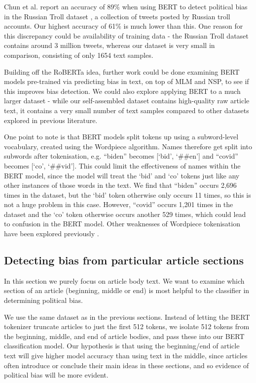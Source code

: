 Chun et al. report an accuracy of 89\% when using BERT to detect political bias in the Russian Troll dataset \cite{russian-troll}, a collection of tweets posted by Russian troll accounts. Our highest accuracy of 61\% is much lower than this. One reason for this discrepancy could be availability of training data - the Russian Troll dataset contains around 3 million tweets, whereas our dataset is very small in comparison, consisting of only 1654 text samples.

Building off the RoBERTa idea, further work could be done examining BERT models pre-trained via predicting bias in text, on top of MLM and NSP, to see if this improves bias detection. We could also explore applying BERT to a much larger dataset - while our self-assembled dataset contains high-quality raw article text, it contains a very small number of text samples compared to other datasets explored in previous literature.

One point to note is that BERT models split tokens up using a subword-level vocabulary, created using the Wordpiece \cite{wordpiece} algorithm. Names therefore get split into subwords after tokenisation, e.g. ``biden'' becomes [`bid', `\#\#en'] and ``covid'' becomes [`co', `\#\#vid']. This could limit the effectiveness of names within the BERT model, since the model will treat the `bid' and `co' tokens just like any other instances of those words in the text. We find that ``biden'' occurs 2,696 times in the dataset, but the `bid' token otherwise only occurs 11 times, so this is not a huge problem in this case. However, ``covid'' occurs 1,201 times in the dataset and the `co' token otherwise occurs another 529 times, which could lead to confusion in the BERT model. Other weaknesses of Wordpiece tokenisation have been explored previously \cite{wordpiece-weaknesses}.

\subsection{Detecting bias from particular article sections} \label{sec:article-sections}

In this section we purely focus on article body text. We want to examine which section of an article (beginning, middle or end) is most helpful to the classifier in determining political bias.

We use the same dataset as in the previous sections. Instead of letting the BERT tokenizer truncate articles to just the first 512 tokens, we isolate 512 tokens from the beginning, middle, and end of article bodies, and pass these into our BERT classification model. Our hypothesis is that using the beginning/end of article text will give higher model accuracy than using text in the middle, since articles often introduce or conclude their main ideas in these sections, and so evidence of political bias will be more evident.

